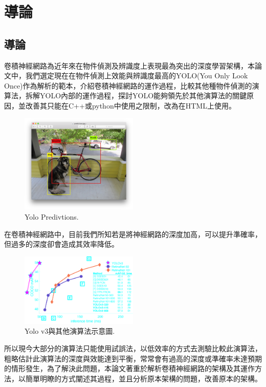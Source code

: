 \chapter{導論}
\label{c:1}

\section{導論}
卷積神經網路為近年來在物件偵測及辨識度上表現最為突出的深度學習架構，本論文中，我們選定現在在物件偵測上效能與辨識度最高的YOLO(You Only Look Once)作為解析的範本，介紹卷積神經網路的運作過程，比較其他種物件偵測的演算法，拆解YOLO內部的運作過程，探討YOLO能夠領先於其他演算法的關鍵原因，並改善其只能在C++或python中使用之限制，改為在HTML上使用。
\\
\begin{figure}[H]
  \centering
    \includegraphics[width=0.5\textwidth]{fig/yolopredictions.png}
    \caption{\label{fig:yolov3}Yolo Predivtions.}
\end{figure}
在卷積神經網路中，目前我們所知若是將神經網路的深度加高，可以提升準確率，但過多的深度卻會造成其效率降低。\\
\begin{figure}[H]
  \centering
    \includegraphics[width=0.5\textwidth]{fig/map50blue.png}
    \caption{\label{fig:yolov3}Yolo v3與其他演算法示意圖.}
\end{figure}
所以現今大部分的演算法只能使用試誤法，以低效率的方式去測驗比較此演算法，粗略估計此演算法的深度與效能達到平衡，常常會有過高的深度或準確率未達預期的情形發生，為了解決此問題，本論文著重於解析卷積神經網路的架構及其運作方法，以簡單明瞭的方式闡述其過程，並且分析原本架構的問題，改善原本的架構。\\

